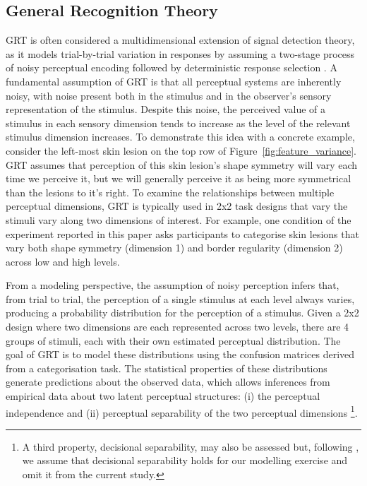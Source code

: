 \documentclass[man, 12pt, a4paper,  donotrepeattitle, floatsintext, draftfirst]{apa7}
\begin{document}
\subsection{General Recognition Theory}
GRT is often considered a multidimensional extension of signal detection theory, as it models trial-by-trial variation in responses by assuming a two-stage process of noisy perceptual encoding followed by deterministic response selection \parencite{ashby2015multidimensional}.
A fundamental assumption of GRT is that all perceptual systems are inherently noisy, with noise present both in the stimulus and in the observer's sensory representation of the stimulus.
Despite this noise, the perceived value of a stimulus in each sensory dimension tends to increase as the level of the relevant stimulus dimension increases.
To demonstrate this idea with a concrete example, consider the left-most skin lesion on the top row of Figure~\ref{fig:feature_variance}.
GRT assumes that perception of this skin lesion's shape symmetry will vary each time we perceive it, but we will generally  perceive it as being more symmetrical than the lesions to it's right.
To examine the relationships between multiple perceptual dimensions, GRT is typically used in 2x2 task designs that vary the stimuli vary along two dimensions of interest.
For example, one condition of the experiment reported in this paper asks participants to categorise skin lesions that vary both shape symmetry (dimension 1) and border regularity (dimension 2) across low and high levels.

From a modeling perspective, the assumption of noisy perception infers that, from trial to trial, the perception of a single stimulus at each level always varies, producing a probability distribution for the perception of a stimulus.
Given a 2x2 design where two dimensions are each represented across two levels, there are 4 groups of stimuli, each with their own estimated perceptual distribution.
The goal of GRT is to model these distributions using the confusion matrices derived from a categorisation task.
The statistical properties of these distributions generate predictions about the observed data, which allows inferences from empirical data about two latent perceptual structures:
(i) the perceptual independence and
(ii) perceptual separability of the two perceptual dimensions
\footnote{A third property, decisional separability, may also be assessed but, following \parencite{silbert2016tutorial}, we assume that decisional separability holds for our modelling exercise and omit it from the current study.}.
\end{document}
